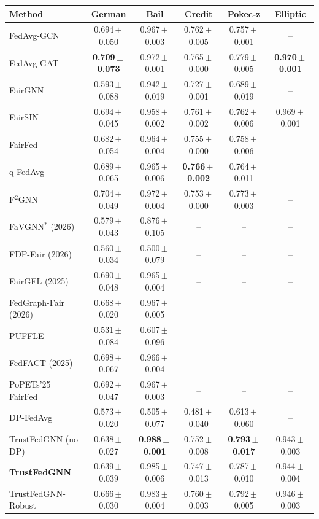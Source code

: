 \begin{tabular}{lccccc}
\toprule
Method & German & Bail & Credit & Pokec-z & Elliptic \\
\midrule
FedAvg-GCN & 0.694\,$\pm$\,0.050 & 0.967\,$\pm$\,0.003 & 0.762\,$\pm$\,0.005 & 0.757\,$\pm$\,0.001 & -- \\
FedAvg-GAT & \textbf{0.709\,$\pm$\,0.073} & 0.972\,$\pm$\,0.001 & 0.765\,$\pm$\,0.000 & 0.779\,$\pm$\,0.005 & \textbf{0.970\,$\pm$\,0.001} \\
FairGNN & 0.593\,$\pm$\,0.088 & 0.942\,$\pm$\,0.019 & 0.727\,$\pm$\,0.001 & 0.689\,$\pm$\,0.019 & -- \\
FairSIN & 0.694\,$\pm$\,0.045 & 0.958\,$\pm$\,0.002 & 0.761\,$\pm$\,0.002 & 0.762\,$\pm$\,0.006 & 0.969\,$\pm$\,0.001 \\
FairFed & 0.682\,$\pm$\,0.054 & 0.964\,$\pm$\,0.004 & 0.755\,$\pm$\,0.000 & 0.758\,$\pm$\,0.006 & -- \\
q-FedAvg & 0.689\,$\pm$\,0.065 & 0.965\,$\pm$\,0.006 & \textbf{0.766\,$\pm$\,0.002} & 0.764\,$\pm$\,0.011 & -- \\
F$^2$GNN & 0.704\,$\pm$\,0.049 & 0.972\,$\pm$\,0.004 & 0.753\,$\pm$\,0.000 & 0.773\,$\pm$\,0.003 & -- \\
FaVGNN$^{\ast}$ (2026) & 0.579\,$\pm$\,0.043 & 0.876\,$\pm$\,0.105 & -- & -- & -- \\
FDP-Fair (2026) & 0.560\,$\pm$\,0.034 & 0.500\,$\pm$\,0.079 & -- & -- & -- \\
FairGFL (2025) & 0.690\,$\pm$\,0.048 & 0.965\,$\pm$\,0.004 & -- & -- & -- \\
FedGraph-Fair (2026) & 0.668\,$\pm$\,0.020 & 0.967\,$\pm$\,0.005 & -- & -- & -- \\
PUFFLE & 0.531\,$\pm$\,0.084 & 0.607\,$\pm$\,0.096 & -- & -- & -- \\
FedFACT (2025) & 0.698\,$\pm$\,0.067 & 0.966\,$\pm$\,0.004 & -- & -- & -- \\
PoPETs'25 FairFed & 0.692\,$\pm$\,0.047 & 0.967\,$\pm$\,0.003 & -- & -- & -- \\
\midrule
DP-FedAvg & 0.573\,$\pm$\,0.020 & 0.505\,$\pm$\,0.077 & 0.481\,$\pm$\,0.040 & 0.613\,$\pm$\,0.060 & -- \\
TrustFedGNN (no DP) & 0.638\,$\pm$\,0.027 & \textbf{0.988\,$\pm$\,0.001} & 0.752\,$\pm$\,0.008 & \textbf{0.793\,$\pm$\,0.017} & 0.943\,$\pm$\,0.003 \\
\textbf{TrustFedGNN} & 0.639\,$\pm$\,0.039 & 0.985\,$\pm$\,0.006 & 0.747\,$\pm$\,0.013 & 0.787\,$\pm$\,0.010 & 0.944\,$\pm$\,0.004 \\
TrustFedGNN-Robust & 0.666\,$\pm$\,0.030 & 0.983\,$\pm$\,0.004 & 0.760\,$\pm$\,0.003 & 0.792\,$\pm$\,0.005 & 0.946\,$\pm$\,0.003 \\
\bottomrule
\end{tabular}